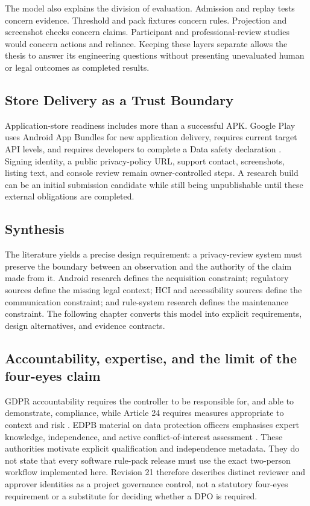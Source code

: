 The model also explains the division of evaluation. Admission and replay tests concern evidence. Threshold and pack fixtures concern rules. Projection and screenshot checks concern claims. Participant and professional-review studies would concern actions and reliance. Keeping these layers separate allows the thesis to answer its engineering questions without presenting unevaluated human or legal outcomes as completed results.

\subsection{Store Delivery as a Trust Boundary}

Application-store readiness includes more than a successful APK. Google Play uses Android App Bundles for new application delivery, requires current target API levels, and requires developers to complete a Data safety declaration \cite{androidbundle2026,playtarget2026,playdatasafety2026}. Signing identity, a public privacy-policy URL, support contact, screenshots, listing text, and console review remain owner-controlled steps. A research build can be an initial submission candidate while still being unpublishable until these external obligations are completed.

\subsection{Synthesis}

The literature yields a precise design requirement: a privacy-review system must preserve the boundary between an observation and the authority of the claim made from it. Android research defines the acquisition constraint; regulatory sources define the missing legal context; HCI and accessibility sources define the communication constraint; and rule-system research defines the maintenance constraint. The following chapter converts this model into explicit requirements, design alternatives, and evidence contracts.
\subsection{Accountability, expertise, and the limit of the four-eyes claim}

GDPR accountability requires the controller to be responsible for, and able to demonstrate, compliance, while Article 24 requires measures appropriate to context and risk \cite{eurlex2016}. EDPB material on data protection officers emphasises expert knowledge, independence, and active conflict-of-interest assessment \cite{edpbdposme2026}. These authorities motivate explicit qualification and independence metadata. They do not state that every software rule-pack release must use the exact two-person workflow implemented here. Revision 21 therefore describes distinct reviewer and approver identities as a project governance control, not a statutory four-eyes requirement or a substitute for deciding whether a DPO is required.
